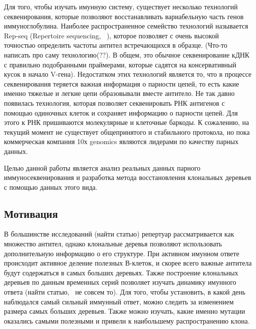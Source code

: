 \documentclass{spbau-diploma}
\begin{document}
Для того, чтобы изучать имунную систему, существует несколько технологий секвенирования, которые позволяют восстанавливать вариабельную часть генов иммуноглобулина.
Наиболее распространенное семейство технологий называется Rep-seq (Repertoire sequencing, ~\cite{pmid22043864}), которое позволяет с очень высокой точностью определить частоты антител встречающихся в образце.
(Что-то написать про саму технологию(??).
В общем, это обычное секвенирование кДНК с правильно подобранными праймерами, которые садятся на консервативный кусок в начало V-гена).
Недостатком этих технологий является то, что в процессе секвенирования теряется важная информация о парности цепей, то есть какие именно тяжелые и легкие цепи образовывали вместе антитело.
Не так давно появилась технология, которая позволяет секвенировать РНК антигенов с помощью одиночных клеток и сохраняет информацию о парности цепей.
Для этого к РНК пришиваются молекулярные и клеточные баркоды.
К сожалению, на текущий момент не существует общепринятого и стабильного протокола, но пока коммерческая компания 10х genomics являются лидерами по качеству парных данных.

Целью данной работы является анализ реальных данных парного иммуносеквенирования и разработка метода восстановления клональных деревьев с помощью данных этого вида.




\subsection{Мотивация}

В большинстве исследований (найти статью) репертуар рассматривается как множество антител, однако клональные деревья позволяют использовать дополнительную информацию о его структуре.
При активном имунном ответе происходит активное деление полезных В-клеток, и скорее всего важные антитела будут содержаться в самых больших деревьях.
Также построение клональных деревьев по данным временных серий позволяет изучать динамику имунного ответа (найти статью,~\cite{stern2014b} не совсем то).
Для того, чтобы установить, в какой день наблюдался самый сильный иммунный ответ, можно следить за изменением размера самых больших деревьев.
Также можно изучать, какие именно мутации оказались самыми полезными и привели к наибольшему распространению клона.
\end{document}
